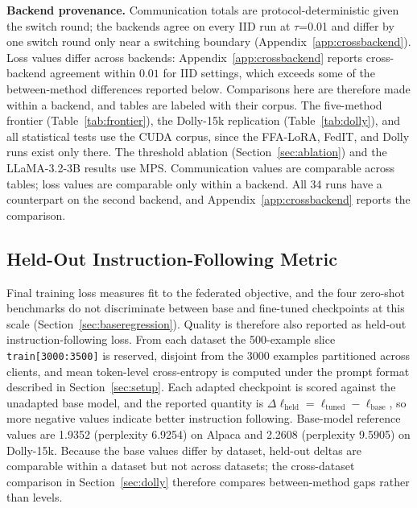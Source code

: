 \textbf{Backend provenance.} Communication totals are protocol-deterministic given the switch round; the backends agree on every IID run at $\tau$=0.01 and differ by one switch round only near a switching boundary (Appendix~\ref{app:crossbackend}). Loss values differ across backends: Appendix~\ref{app:crossbackend} reports cross-backend agreement within $0.01$ for IID settings, which exceeds some of the between-method differences reported below. Comparisons here are therefore made within a backend, and tables are labeled with their corpus. The five-method frontier (Table~\ref{tab:frontier}), the Dolly-15k replication (Table~\ref{tab:dolly}), and all statistical tests use the CUDA corpus, since the FFA-LoRA, FedIT, and Dolly runs exist only there. The threshold ablation (Section~\ref{sec:ablation}) and the LLaMA-3.2-3B results use MPS. Communication values are comparable across tables; loss values are comparable only within a backend. All 34 runs have a counterpart on the second backend, and Appendix~\ref{app:crossbackend} reports the comparison.

\subsection{Held-Out Instruction-Following Metric}
\label{sec:heldout}
Final training loss measures fit to the federated objective, and the four zero-shot benchmarks do not discriminate between base and fine-tuned checkpoints at this scale (Section~\ref{sec:baseregression}). Quality is therefore also reported as held-out instruction-following loss. From each dataset the 500-example slice \texttt{train[3000:3500]} is reserved, disjoint from the 3000 examples partitioned across clients, and mean token-level cross-entropy is computed under the prompt format described in Section~\ref{sec:setup}. Each adapted checkpoint is scored against the unadapted base model, and the reported quantity is $\Delta\ell_{\mathrm{held}} = \ell_{\mathrm{tuned}} - \ell_{\mathrm{base}}$, so more negative values indicate better instruction following. Base-model reference values are 1.9352 (perplexity 6.9254) on Alpaca and 2.2608 (perplexity 9.5905) on Dolly-15k. Because the base values differ by dataset, held-out deltas are comparable within a dataset but not across datasets; the cross-dataset comparison in Section~\ref{sec:dolly} therefore compares between-method gaps rather than levels.

